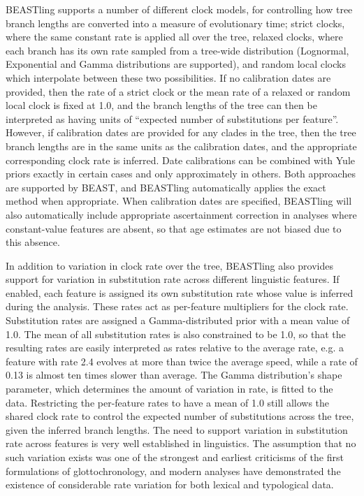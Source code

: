 \documentclass[10pt,a4paper]{article}
\begin{document}
BEASTling supports a number of different clock models, for controlling how tree branch lengths are converted into a measure of evolutionary time; strict clocks, where the same constant rate is applied all over the tree, relaxed clocks\cite{Drummond2006}, where each branch has its own rate sampled from a tree-wide distribution (Lognormal, Exponential and Gamma distributions are supported), and random local clocks\cite{Drummond2010} which interpolate between these two possibilities.  If no calibration dates are provided, then the rate of a strict clock or the mean rate of a relaxed or random local clock is fixed at 1.0, and the branch lengths of the tree can then be interpreted as having units of ``expected number of substitutions per feature''.  However, if calibration dates are provided for any clades in the tree, then the tree branch lengths are in the same units as the calibration dates, and the appropriate corresponding clock rate is inferred.  Date calibrations can be combined with Yule priors exactly in certain cases\cite{Heled2011} and only approximately in others.  Both approaches are supported by BEAST, and BEASTling automatically applies the exact method when appropriate.  When calibration dates are specified, BEASTling will also automatically include appropriate ascertainment correction in analyses where constant-value features are absent, so that age estimates are not biased due to this absence.

In addition to variation in clock rate over the tree, BEASTling also provides support for variation in substitution rate across different linguistic features.  If enabled, each feature is assigned its own substitution rate whose value is inferred during the analysis.  These rates act as per-feature multipliers for the clock rate.  Substitution rates are assigned a Gamma-distributed prior with a mean value of 1.0.  The mean of all substitution rates is also constrained to be 1.0, so that the resulting rates are easily interpreted as rates relative to the average rate, e.g. a feature with rate 2.4 evolves at more than twice the average speed, while a rate of 0.13 is almost ten times slower than average.  The Gamma distribution's shape parameter, which determines the amount of variation in rate, is fitted to the data.  Restricting the per-feature rates to have a mean of 1.0 still allows the shared clock rate to control the expected number of substitutions across the tree, given the inferred branch lengths. The need to support variation in substitution rate across features is very well established in linguistics.  The assumption that no such variation exists was one of the strongest and earliest criticisms of the first formulations of glottochronology, and modern analyses have demonstrated the existence of considerable rate variation for both lexical\cite{Pagel2007} and typological\cite{Greenhill2010,Dediu2011} data.
\end{document}
